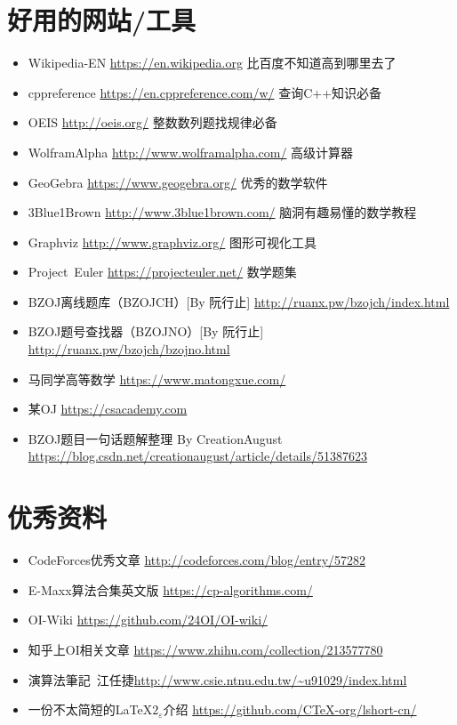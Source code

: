 \section{好用的网站/工具}
\begin{itemize}
    \item Wikipedia-EN \url{https://en.wikipedia.org} 比百度不知道高到哪里去了
    \item cppreference \url{https://en.cppreference.com/w/} 查询C++知识必备
    \item OEIS \url{http://oeis.org/} 整数数列题找规律必备
    \item WolframAlpha \url{http://www.wolframalpha.com/} 高级计算器
    \item GeoGebra \url{https://www.geogebra.org/} 优秀的数学软件
    \item 3Blue1Brown \url{http://www.3blue1brown.com/} 脑洞有趣易懂的数学教程
    \item Graphviz \url{http://www.graphviz.org/} 图形可视化工具
    \item Project~Euler \url{https://projecteuler.net/} 数学题集
    \item BZOJ离线题库（BZOJCH）[By 阮行止] \url{http://ruanx.pw/bzojch/index.html}
    \item BZOJ题号查找器（BZOJNO）[By 阮行止]
    \url{http://ruanx.pw/bzojch/bzojno.html}
    \item 马同学高等数学 \url{https://www.matongxue.com/}
    \item 某OJ \url{https://csacademy.com}
    \item BZOJ题目一句话题解整理 By CreationAugust\\\url{https://blog.csdn.net/creationaugust/article/details/51387623}
\end{itemize}
\section{优秀资料}
\begin{itemize}
    \item CodeForces优秀文章 \url{http://codeforces.com/blog/entry/57282}
    \item E-Maxx算法合集英文版 \url{https://cp-algorithms.com/}
    \item OI-Wiki \url{https://github.com/24OI/OI-wiki/}
    \item 知乎上OI相关文章 \url{https://www.zhihu.com/collection/213577780}
    \item 演算法筆記~江任捷\url{http://www.csie.ntnu.edu.tw/\~u91029/index.html}
    \item 一份不太简短的\LaTeX{}$2_{\varepsilon}$介绍
    \url{https://github.com/CTeX-org/lshort-cn/}
\end{itemize}
